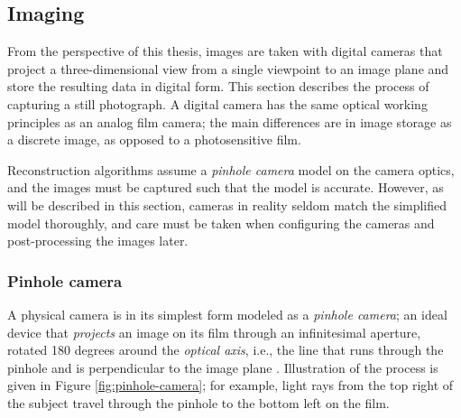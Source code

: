 
\subsection{Imaging} \label{sec:imaging} %

From the perspective of this thesis, images are taken with digital cameras that project a three-dimensional view from a single viewpoint to an image plane and store the resulting data in digital form.
This section describes the process of capturing a still photograph.
A digital camera has the same optical working principles as an analog film camera;
the main differences are in image storage as a discrete image, as opposed to a photosensitive film.

Reconstruction algorithms assume a \emph{pinhole camera} model on the camera optics, and the images must be captured such that the model is accurate.
However, as will be described in this section, cameras in reality seldom match the simplified model thoroughly, and care must be taken when configuring the cameras and post-processing the images later.


\subsubsection{Pinhole camera} \label{sec:pinhole} %




A physical camera is in its simplest form modeled as a \emph{pinhole camera}; an ideal device that \emph{projects} an image on its film through an infinitesimal aperture, rotated 180 degrees around the \emph{optical axis}, i.e., the line that runs through the pinhole and is perpendicular to the image plane \cite{greenleaf1950photographic,kingslake1989history}.
Illustration of the process is given in Figure \ref{fig:pinhole-camera}; for example, light rays from the top right of the subject travel through the pinhole to the bottom left on the film.


